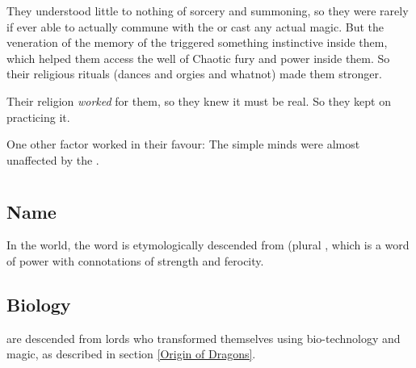 They understood little to nothing of sorcery and summoning, so they were rarely if ever able to actually commune with the \xss{} or cast any actual magic. 
But the veneration of the memory of the \xss{} triggered something instinctive inside them, which helped them access the well of Chaotic \xsic{} fury and power inside them. 
So their religious rituals (dances and orgies and whatnot) made them stronger. 

Their religion \emph{worked} for them, so they knew it must be real. 
So they kept on practicing it. 

One other factor worked in their favour: 
The simple \cregorr{} minds were almost unaffected by the . 















\section{\Dragon}
\index{\dragon}









\subsection{Name}
In the \Miith{} world, the word \quo{\dragon} is etymologically descended from \emph{\Draecchonosh{}} (plural \emph{\Draecchonosh{}}, which is a \draconic{} word of power with connotations of strength and ferocity. 









\subsection{Biology}
\Dragons{} are descended from \naga{} lords who transformed themselves using bio-technology and magic, as described in section \ref{Origin of Dragons}. 

